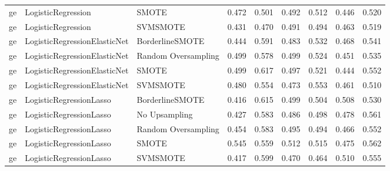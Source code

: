 \begin{tabular}{lllllllll}
      ge &           LogisticRegression &               SMOTE & 0.472 &                     0.501 &                 0.492 &                  0.512 &                                   0.446 &     0.520 \\
      ge &           LogisticRegression &            SVMSMOTE & 0.431 &                     0.470 &                 0.491 &                  0.494 &                                   0.463 &     0.519 \\
      ge & LogisticRegressionElasticNet &     BorderlineSMOTE & 0.444 &                     0.591 &                 0.483 &                  0.532 &                                   0.468 &     0.541 \\
      ge & LogisticRegressionElasticNet & Random Oversampling & 0.499 &                     0.578 &                 0.499 &                  0.524 &                                   0.451 &     0.535 \\
      ge & LogisticRegressionElasticNet &               SMOTE & 0.499 &                     0.617 &                 0.497 &                  0.521 &                                   0.444 &     0.552 \\
      ge & LogisticRegressionElasticNet &            SVMSMOTE & 0.480 &                     0.554 &                 0.473 &                  0.553 &                                   0.461 &     0.510 \\
      ge &      LogisticRegressionLasso &     BorderlineSMOTE & 0.416 &                     0.615 &                 0.499 &                  0.504 &                                   0.508 &     0.530 \\
      ge &      LogisticRegressionLasso &       No Upsampling & 0.427 &                     0.583 &                 0.486 &                  0.498 &                                   0.478 &     0.561 \\
      ge &      LogisticRegressionLasso & Random Oversampling & 0.454 &                     0.583 &                 0.495 &                  0.494 &                                   0.466 &     0.552 \\
      ge &      LogisticRegressionLasso &               SMOTE & 0.545 &                     0.559 &                 0.512 &                  0.515 &                                   0.475 &     0.562 \\
      ge &      LogisticRegressionLasso &            SVMSMOTE & 0.417 &                     0.599 &                 0.470 &                  0.464 &                                   0.510 &     0.555 \\

\end{tabular}
